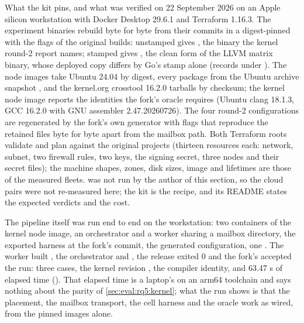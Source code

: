 What the kit pins, and what was verified on 22 September 2026 on an Apple
silicon workstation with Docker Desktop 29.6.1 and Terraform 1.16.3. The
experiment binaries rebuild byte for byte from their commits in a
digest-pinned  with the flags of the original
builds:  unstamped gives
,
the binary the kernel round-2 report names;  stamped
 gives
,
the clean form of the LLVM matrix binary, whose deployed copy differs by Go's
 stamp alone (records under
). The node images take Ubuntu 24.04
by digest, every package from the Ubuntu archive snapshot
, and the kernel.org crosstool 16.2.0 tarballs by
checksum; the kernel node image reports the identities the fork's oracle
requires (Ubuntu clang 18.1.3, GCC 16.2.0 with GNU assembler 2.47.20260726).
The four round-2 configurations are regenerated by the fork's own generator
with flags that reproduce the retained files byte for byte apart from the
mailbox path. Both Terraform roots validate and plan against the original
projects (thirteen resources each: network, subnet, two firewall rules, two
keys, the signing secret, three nodes and their secret files); the machine
shapes, zones, disk sizes, image and lifetimes are those of the measured
fleets.  was not run by the author of this section, so
the cloud pairs were not re-measured here; the kit is the recipe, and its
README states the expected verdicts and the cost.

The pipeline itself was run end to end on the workstation: two containers of
the kernel node image, an orchestrator and a worker sharing a mailbox
directory, the exported harness at the fork's commit, the generated
 configuration, one . The worker built
, the orchestrator  and ,
the release exited 0 and the fork's  accepted the run: three
cases, the kernel revision , the compiler identity, and 63.47 s
of elapsed time ().
That elapsed time is a laptop's on an arm64 toolchain and says nothing about
the parity of \cref{sec:eval:rq5:kernel}; what the run shows is that the
placement, the mailbox transport, the cell harness and the oracle work as
wired, from the pinned images alone.
